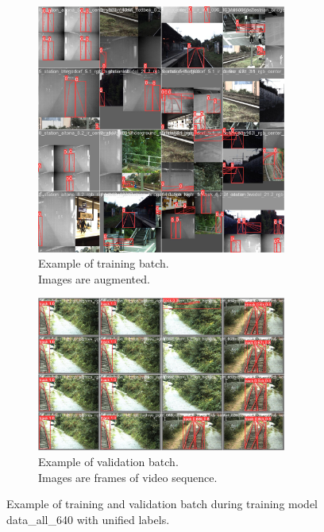 \documentclass[Master,MDS,english]{BASE/twbook} %
\begin{document}
\begin{figure}
\centering
\begin{subfigure}[t]{.5\textwidth}
  \centering
  \includegraphics[width=0.9\textwidth]{images/yolo/all/train_batch0}
  \caption{Example of training batch.\\ Images are augmented.}
    \label{fig:mosaic_augmentation_all}
\end{subfigure}%
\begin{subfigure}[t]{.5\textwidth}
  \centering
  \includegraphics[width=0.9\textwidth]{images/yolo/all/val_batch2_pred}
  \caption{Example of validation batch.\\ Images are frames of video sequence.}
\end{subfigure}
\caption{Example of training and validation batch during training model data\_all\_640 with unified labels.}
\label{fig:yolo_all_example}
\end{figure}
\end{document}
